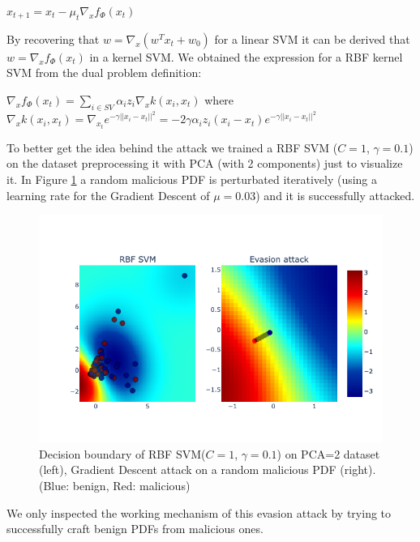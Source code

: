 \documentclass[twocolumn, switch]{article} %
\newcommand\x{0.7}
\begin{document}
\begin{center}
	$x_{t+1} = x_t - \mu_t\nabla_xf_{\Phi}(x_t)$
\end{center}
By recovering that $w = \nabla_x(w^Tx_t+w_0)$ for a linear SVM it can be derived that $w = \nabla_xf_{\Phi}(x_t)$ in a kernel SVM.
We obtained the expression for a RBF kernel SVM from the dual problem definition:
\begin{center}
	$\nabla_xf_{\Phi}(x_t) = \sum_{i \in SV}^{}\alpha_iz_i\nabla_xk(x_i,x_t)$
	where $\nabla_xk(x_i,x_t) = \nabla_{x_t}e^{-\gamma||x_i-x_t||^2}=-2\gamma\alpha_i z_i(x_i - x_t)e^{-\gamma||x_i-x_t||^2}$
\end{center}
To better get the idea behind the attack we trained a RBF SVM ($C=1$, $\gamma=0.1$) on the dataset preprocessing it with PCA (with 2 components) just to visualize it. In Figure \ref{fig:svmattack} a random malicious PDF is perturbated iteratively (using a learning rate for the Gradient Descent of $\mu=0.03$) and it is successfully attacked.
\begin{figure}[ht!]
	\centering
	\includegraphics[width=\x\linewidth]{svmattack.png}
	\caption{Decision boundary of RBF SVM($C=1$, $\gamma=0.1$) on PCA=2 dataset (left), Gradient Descent attack on a random malicious PDF (right). (Blue: benign, Red: malicious)}
	\label{fig:svmattack}
\end{figure}
We only inspected the working mechanism of this evasion attack by trying to successfully craft benign PDFs from malicious ones.
\end{document}
